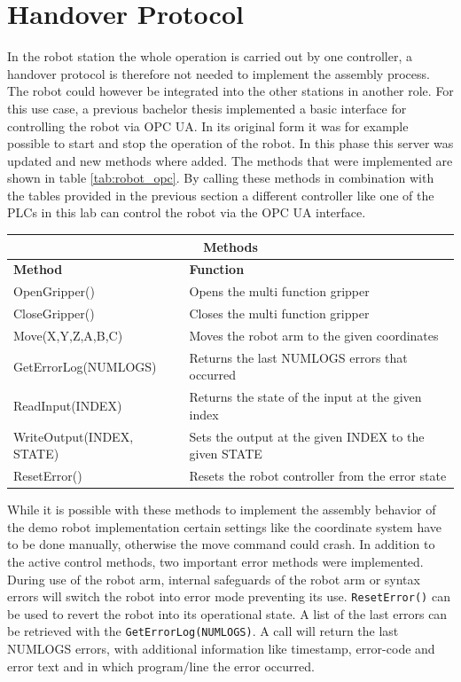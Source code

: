 \documentclass{article}
\begin{document}
\section{Handover Protocol}
In the robot station the whole operation is carried out by one controller, a handover protocol is therefore not needed to implement the assembly process. The robot could however be integrated into the other stations in another role. For this use case, a previous bachelor thesis implemented a basic interface for controlling the robot via OPC UA. In its original form it was for example possible to start and stop the operation of the robot. In this phase this server was updated and new methods where added.\newline
The methods that were implemented are shown in table \ref{tab:robot_opc}. By calling these methods in combination with the tables provided in the previous section a different controller like one of the PLCs in this lab can control the robot via the OPC UA interface.
\begin{center}
	\setlength\extrarowheight{4pt}
	\small
	\begin{tabularx}{\textwidth}{|p{5cm}|X|}
		\hline
		
		\multicolumn{2}{|c|}{\bf \color{black} \large Methods}\\
		\hline\hline
		
		\bf Method & \bf Function\\
		\hline\hline
		OpenGripper() & Opens the multi function gripper\\
		\hline
		CloseGripper() & Closes the multi function gripper\\
		\hline
		Move(X,Y,Z,A,B,C) & Moves the robot arm to the given coordinates\\
		\hline
		GetErrorLog(NUMLOGS) & Returns the last NUMLOGS errors that occurred\\
		\hline
		ReadInput(INDEX) & Returns the state of the input at the given index\\
		\hline
		WriteOutput(INDEX, STATE) & Sets the output at the given INDEX to the given STATE\\
		\hline
		ResetError() & Resets the robot controller from the error state\\
		\hline
	\end{tabularx}
\label{tab:robot_opc}
\end{center}
While it is possible with these methods to implement the assembly behavior of the demo robot implementation certain settings like the coordinate system have to be done manually, otherwise the move command could crash.\newline
In addition to the active control methods, two important error methods were implemented. During use of the robot arm, internal safeguards of the robot arm or syntax errors will switch the robot into error mode preventing its use. \texttt{ResetError()} can be used to revert the robot into its operational state. A list of the last errors can be retrieved with the \texttt{GetErrorLog(NUMLOGS)}. A call will return the last NUMLOGS errors, with additional information like timestamp, error-code and error text and in which program/line the error occurred.
\end{document}
